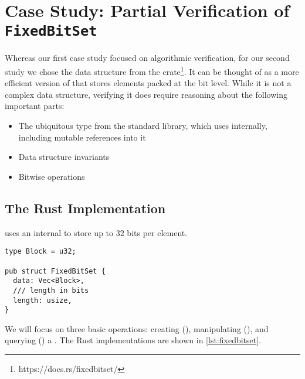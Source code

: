\section{Case Study: Partial Verification of \texttt{FixedBitSet}}
\label{sec:fixedbitset}

Whereas our first case study focused on algorithmic verification, for our second
study we chose the  data structure from the 
crate\footnote{https://docs.rs/fixedbitset/}. It can be thought of as
a more efficient version of  that stores elements packed at the bit
level. While it is not a complex data structure, verifying it does require
reasoning about the following important parts:

\begin{itemize}
  \item The ubiquitous  type from the standard library, which
     uses internally, including mutable references into it
  \item Data structure invariants
  \item Bitwise operations
\end{itemize}

\subsection{The Rust Implementation}

 uses an internal  to store up to 32 bits per element.

\begin{verbatim}
type Block = u32;

pub struct FixedBitSet {
  data: Vec<Block>,
  /// length in bits
  length: usize,
}
\end{verbatim}

We will focus on three basic operations: creating (),
manipulating (), and querying () a
. The Rust implementations are shown in \autoref{lst:fixedbitset}.

